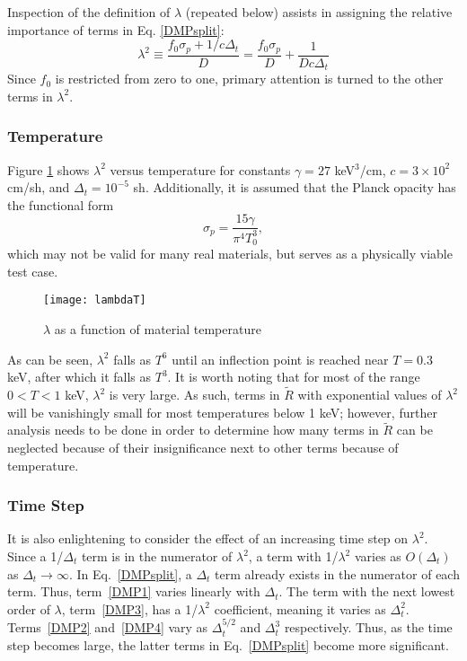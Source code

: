 Inspection of the definition of $\lambda$ (repeated below) assists in assigning
the relative importance of terms in Eq. \eqref{DMPsplit}:
\[\lambda^2\equiv\frac{f_0\sigma_p + 1/c\Delta_t}{D}
  = \frac{f_0\sigma_p}{D} + \frac{1}{Dc\Delta_t} \]
  Since $f_0$ is restricted from zero to one, primary attention is turned to the
other terms in $\lambda^2$.


\subsubsection{Temperature}
Figure \ref{lambdaT} shows
$\lambda^2$ versus temperature for constants $\gamma=27$ keV$^3$/cm,
$c=3\times10^2$
cm/sh, and $\Delta_t=10^{-5}$ sh.  Additionally, it is assumed that the Planck
opacity
has the functional form
\begin{equation}
\sigma_p=\frac{15\gamma}{\pi^4T_0^3}\label{sigp assum},
\end{equation}
which may not be valid for many real materials, but serves as a
physically viable test case.

\begin{figure}[htb]
\centering
\texttt{[image: lambdaT]}
\caption{$\lambda$ as a function of material temperature}
\label{lambdaT}
\end{figure}
As can be seen, $\lambda^2$ falls as $T^6$ until an inflection point is reached
near $T=0.3$ keV, after which it falls as $T^3$.  It is worth noting that for
most of the range $0<T<1$ keV, $\lambda^2$ is very large.  As such, terms in
$\tilde R$ with exponential values of $\lambda^2$ will be vanishingly small for
most temperatures below 1 keV; however, further analysis needs to be done in
order to determine how many terms in $\tilde R$ can be neglected because of
their insignificance next to other terms because of temperature.


\subsubsection{Time Step}
It is also enlightening to consider the effect of an increasing time step on
$\lambda^2$.  Since a 1/$\Delta_t$ term is in the numerator of $\lambda^2$, a
term with 1/$\lambda^2$ varies as $O(\Delta_t)$ as $\Delta_t \to \infty$.  In
Eq.\
\eqref{DMPsplit}, a $\Delta_t$ term already exists in the numerator of each
term.
Thus, term\ \eqref{DMP1} varies linearly with $\Delta_t$.  The term with the
next lowest order of $\lambda$, term\ \eqref{DMP3}, has a 1/$\lambda^2$
coefficient, meaning it varies as $\Delta_t^2$.  Terms\ \eqref{DMP2} and\
\eqref{DMP4} vary as $\Delta_t^{5/2}$ and $\Delta_t^3$ respectively.  Thus, as
the time step becomes large, the latter terms in Eq.\ \eqref{DMPsplit} become
more significant.

